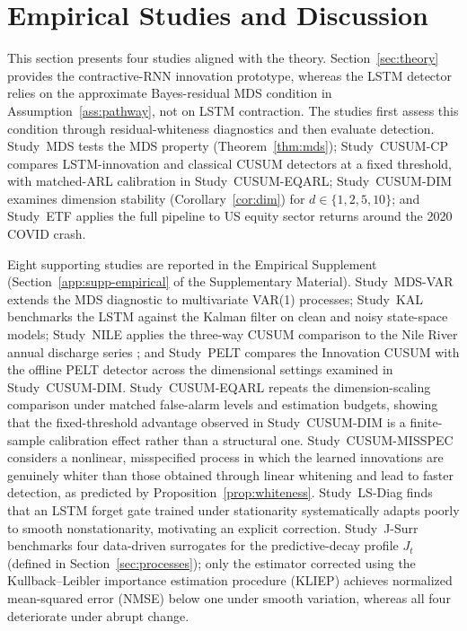\documentclass[bj,authoryear]{imsart}
\theoremstyle{plain}
\theoremstyle{definition}
\begin{document}
\section{Empirical Studies and Discussion}
\label{sec:empirical}
This section presents four studies aligned with the theory.  Section~\ref{sec:theory} provides the contractive-RNN innovation prototype, whereas the LSTM detector relies on the approximate Bayes-residual MDS condition in Assumption~\ref{ass:pathway}, not on LSTM contraction.  The studies first assess this condition through residual-whiteness diagnostics and then evaluate detection.  Study~MDS tests the MDS property (Theorem~\ref{thm:mds}); Study~CUSUM-CP compares LSTM-innovation and classical CUSUM detectors at a fixed threshold, with matched-ARL calibration in Study~CUSUM-EQARL; Study~CUSUM-DIM examines dimension stability (Corollary~\ref{cor:dim}) for $d \in \{1,2,5,10\}$; and Study~ETF applies the full pipeline to US equity sector returns around the 2020 COVID crash.

Eight supporting studies are reported in the Empirical Supplement
(Section~\ref{app:supp-empirical} of the Supplementary Material).
Study~MDS-VAR extends the MDS diagnostic to multivariate VAR(1) processes;
Study~KAL benchmarks the LSTM against the Kalman filter on clean and noisy
state-space models; Study~NILE applies the three-way CUSUM comparison to
the Nile River annual discharge series \citep{cobb1978problem}; and
Study~PELT compares the Innovation CUSUM with the offline PELT detector
across the dimensional settings examined in Study~CUSUM-DIM.
%
Study~CUSUM-EQARL repeats the dimension-scaling comparison under matched
false-alarm levels and estimation budgets, showing that the fixed-threshold
advantage observed in Study~CUSUM-DIM is a finite-sample calibration effect
rather than a structural one. Study~CUSUM-MISSPEC considers a nonlinear,
misspecified process in which the learned innovations are genuinely whiter
than those obtained through linear whitening and lead to faster detection,
as predicted by Proposition~\ref{prop:whiteness}.
%
Study~LS-Diag finds that an LSTM forget gate trained under stationarity
systematically adapts poorly to smooth nonstationarity, motivating an
explicit correction. Study~J-Surr benchmarks four data-driven surrogates
for the predictive-decay profile $J_t$ (defined in
Section~\ref{sec:processes}); only the estimator corrected using the
Kullback--Leibler importance estimation procedure (KLIEP)
\citep{sugiyama2012density} achieves normalized mean-squared error (NMSE)
below one under smooth variation, whereas all four deteriorate under
abrupt change.
\end{document}
